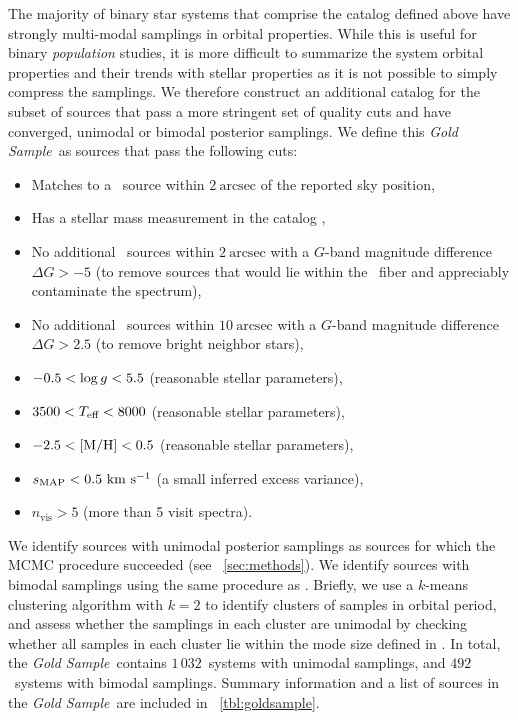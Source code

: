 \documentclass[modern]{aastex63}
\newcommand{\goldsample}{\textit{Gold Sample}}
\newcommand{\ngold}{\ensuremath{1\,032}}
\newcommand{\nbimodal}{\ensuremath{492}}
\begin{document}
The majority of binary star systems that comprise the catalog defined above have
strongly multi-modal samplings in orbital properties.
While this is useful for binary \textit{population} studies, it is more
difficult to summarize the system orbital properties and their trends with
stellar properties as it is not possible to simply compress the samplings.
We therefore construct an additional catalog for the subset of sources that pass
a more stringent set of quality cuts and have converged, unimodal or bimodal
posterior samplings.
We define this \goldsample\ as sources that pass the following cuts:
\begin{itemize}
    \item Matches to a \gaia\ source within $2~\textrm{arcsec}$ of the
          reported  sky position,
    \item Has a stellar mass measurement in the  catalog
          \citep{Queiroz:2019},
    \item No additional \gaia\ sources within $2~\textrm{arcsec}$ with a
          $G$-band magnitude difference $\Delta G > -5$ (to remove sources that
          would lie within the \apogee\ fiber and appreciably contaminate the
          spectrum),
    \item No additional \gaia\ sources within $10~\textrm{arcsec}$ with a
          $G$-band magnitude difference $\Delta G > 2.5$ (to remove bright
          neighbor stars),
    \item $-0.5 < \log g < 5.5$ (reasonable stellar parameters),
    \item $3500 < T_{\textrm{eff}} < 8000$ (reasonable stellar parameters),
    \item $-2.5 < {[{\rm M}/{\rm H}]} < 0.5$ (reasonable stellar parameters),
    \item $s_{\textrm{MAP}} < 0.5~\mathrm{km}~\mathrm{s}^{-1}$ (a small inferred excess variance),
    \item $n_{\textrm{vis}} > 5$ (more than 5 visit spectra).
\end{itemize}

We identify sources with unimodal posterior samplings as sources for which the
MCMC procedure succeeded (see \sectionname~\ref{sec:methods}).
We identify sources with bimodal samplings using the same procedure as
\cite{Price-Whelan:2018}.
Briefly, we use a $k$-means clustering algorithm with $k=2$ to identify clusters
of samples in orbital period, and assess whether the samplings in each cluster
are unimodal by checking whether all samples in each cluster lie within the mode
size defined in \cite{thejoker}.
In total, the \goldsample\ contains \ngold\ systems with unimodal samplings, and
\nbimodal\ systems with bimodal samplings.
Summary information and a list of sources in the \goldsample\ are included in
\tablename~\ref{tbl:goldsample}.
\end{document}
